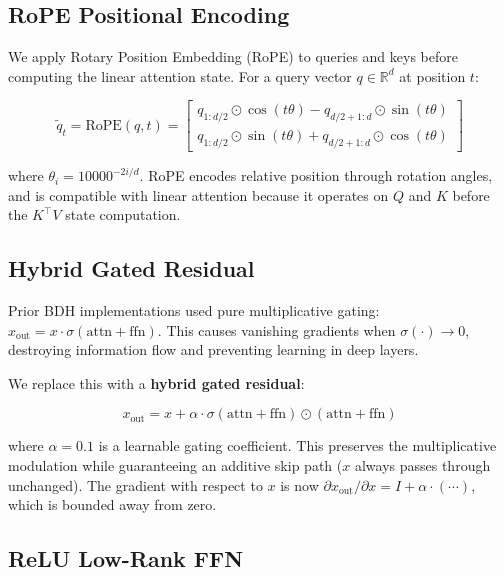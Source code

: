 \documentclass{article}
\begin{document}
\subsection{RoPE Positional Encoding}

We apply Rotary Position Embedding (RoPE) \citep{su2024roformer} to queries and keys before computing the linear attention state. For a query vector $q \in \mathbb{R}^d$ at position $t$:

\begin{equation}
\tilde{q}_t = \text{RoPE}(q, t) = \begin{bmatrix} q_{1:d/2} \odot \cos(t\theta) - q_{d/2+1:d} \odot \sin(t\theta) \\ q_{1:d/2} \odot \sin(t\theta) + q_{d/2+1:d} \odot \cos(t\theta) \end{bmatrix}
\end{equation}

where $\theta_i = 10000^{-2i/d}$. RoPE encodes relative position through rotation angles, and is compatible with linear attention because it operates on $Q$ and $K$ before the $K^\top V$ state computation.

\subsection{Hybrid Gated Residual}

Prior BDH implementations used pure multiplicative gating: $x_{\text{out}} = x \cdot \sigma(\text{attn} + \text{ffn})$. This causes vanishing gradients when $\sigma(\cdot) \to 0$, destroying information flow and preventing learning in deep layers.

We replace this with a \textbf{hybrid gated residual}:

\begin{equation}
x_{\text{out}} = x + \alpha \cdot \sigma(\text{attn} + \text{ffn}) \odot (\text{attn} + \text{ffn})
\end{equation}

where $\alpha = 0.1$ is a learnable gating coefficient. This preserves the multiplicative modulation while guaranteeing an additive skip path ($x$ always passes through unchanged). The gradient with respect to $x$ is now $\partial x_{\text{out}} / \partial x = I + \alpha \cdot (\cdots)$, which is bounded away from zero.

\subsection{ReLU Low-Rank FFN}
\end{document}
